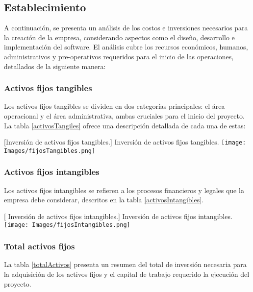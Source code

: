 \subsection{Establecimiento}

A continuación, se presenta un análisis de los costos e inversiones necesarios para la creación de la empresa, considerando aspectos como el diseño, desarrollo e implementación del software. El análisis cubre los recursos económicos, humanos, administrativos y pre-operativos requeridos para el inicio de las operaciones, detallados de la siguiente manera: 

\subsubsection{Activos fijos tangibles}

Los activos fijos tangibles se dividen en dos categorías principales: el área operacional y el área administrativa, ambas cruciales para el inicio del proyecto. La tabla \ref{activosTangiles} ofrece una descripción detallada de cada una de estas:

\vspace{2mm}
\begin{minipage}{0.9\textwidth}
\centering
{}[{Inversión de activos fijos tangibles.}]{ Inversión de activos fijos tangibles. }
\label{activosTangiles}
\texttt{[image: Images/fijosTangibles.png]}
\end{minipage}

\subsubsection{Activos fijos intangibles}

Los activos fijos intangibles se refieren a los procesos financieros y legales que la empresa debe considerar, descritos en la tabla \ref{activosIntangibles}.

\vspace{2mm}
\begin{minipage}{0.9\textwidth}
\centering
{}[{ Inversión de activos fijos intangibles.}]{ Inversión de activos fijos intangibles. }
\label{activosIntangibles}
\texttt{[image: Images/fijosIntangibles.png]}
\end{minipage}

\subsubsection{Total activos fijos}
La tabla \ref{totalActivos} presenta un resumen del total de inversión necesaria para la adquisición de los activos fijos y el capital de trabajo requerido la ejecución del proyecto.

